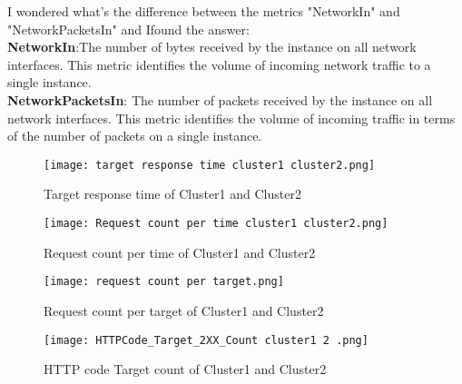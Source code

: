 \documentclass[12pt]{article}
\begin{document}
            I‌ wondered what's the difference between the metrics "NetworkIn"  and "NetworkPacketsIn" and I‌found the answer:\\
         \textbf{NetworkIn}:‌The number of bytes received by the instance on all network interfaces. This metric identifies the volume of incoming network traffic to a single instance.\\
        \textbf{NetworkPacketsIn}: The number of packets received by the instance on all network interfaces. This metric identifies the volume of incoming traffic in terms of the number of packets on a single instance.\\
                \begin{figure}[htpb]
                \centering
                \texttt{[image: target response time cluster1 cluster2.png]}
                    \caption{Target response time of Cluster1 and Cluster2}
                    \label{fig:targerresponsetimec12}
                \end{figure}
                \begin{figure}[htpb]
                \centering
                \texttt{[image: Request count per time cluster1 cluster2.png]}
                    \caption{Request count per time of Cluster1 and Cluster2}
                    \label{fig:reqtimecountc12}
                \end{figure}
                \begin{figure}[htpb]
                \centering
                \texttt{[image: request count per target.png]}
                    \caption{Request count per target of Cluster1 and Cluster2}
                    \label{fig:reqtargetcount}
                \end{figure}
                \begin{figure}[htpb]
                \centering
                \texttt{[image: HTTPCode\_Target\_2XX\_Count cluster1 2 .png]}
                    \caption{HTTP code Target count of Cluster1 and Cluster2}
                    \label{fig:httpcountc12}
                \end{figure}
           


        
\end{document}
